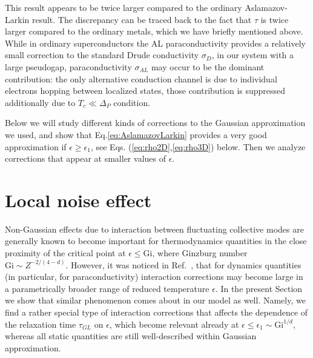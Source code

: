 \documentclass[twocolumn,english,prb]{revtex4-1}
\begin{document}
This result appears to be twice larger compared to the ordinary Aslamazov-Larkin result\cite{AslamazovLarkin}. The discrepancy can be traced back to the fact that  $\tau$ is  twice larger compared to the ordinary metals, which we have briefly mentioned above.
While  in ordinary superconductors the AL paraconductivity provides a
relatively small correction to the standard Drude conductivity $\sigma_D$, 
in our system with a large pseudogap, paraconductivity $\sigma_{AL}$  may occur to be the
dominant contribution: the only alternative conduction channel is due to  individual  electrons  hopping between 
localized states, those contribution is suppressed additionally due to $T_c \ll \Delta_P$ condition.


Below we will  study different kinds of corrections to the Gaussian approximation we used, 
and show that Eq.\eqref{eq:AslamazovLarkin} provides a very good approximation if  $\epsilon \geq \epsilon_1$, see 
Eqs. (\ref{eq:rho2D},\ref{eq:rho3D}) below. Then we analyze corrections that appear at smaller values of $\epsilon$.

\section{Local noise effect}
\label{sec:LocalNoise}
Non-Gaussian effects due to interaction between fluctuating collective modes are generally known to become important 
for thermodynamics quantities in the close proximity of the critical point at $\epsilon \leq  \mathrm {Gi}$,
where Ginzburg number $ \mathrm {Gi} \sim Z^{-2/(4-d)} $.  However, it was noticed in Ref.~\cite{LO2001}, that for dynamics
quantities (in particular, for paraconductivity)  interaction corrections may become large in a parametrically broader 
range of reduced temperature $\epsilon$. In the present Section we show that similar phenomenon comes about in our model as well.
Namely, we find a rather special type of interaction corrections that affects the dependence of the relaxation
time $\tau_{GL}$ on $\epsilon$, which become relevant already at $\epsilon \leq \epsilon_1 \sim \mathrm {Gi}^{1/d}$,
whereas all static  quantities are still well-described within Gaussian approximation.
\end{document}
